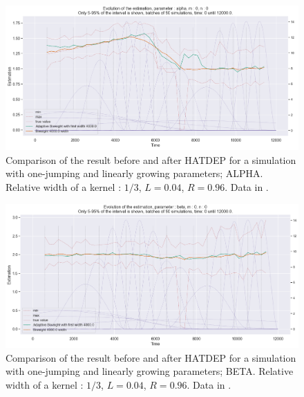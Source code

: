 \begin{figure}
\centering
\includegraphics[width = 0.90 \textwidth]{../imag/chap3/3/J.png}
\caption{Comparison of the result before and after HATDEP for a simulation with one-jumping and linearly growing parameters; ALPHA. Relative width of a kernel : $1/3$, $L = 0.04$, $R = 0.96$. Data in \protect {}.}
\label{fig:first_estimate_3_alpha}
\end{figure}

\begin{figure}
\centering
\includegraphics[width = 0.90 \textwidth]{../imag/chap3/3/K.png}
\caption{Comparison of the result before and after HATDEP for a simulation with one-jumping and linearly growing parameters; BETA. Relative width of a kernel : $1/3$, $L = 0.04$, $R = 0.96$. Data in \protect {}.}
\label{fig:first_estimate_3_beta}
\end{figure}

